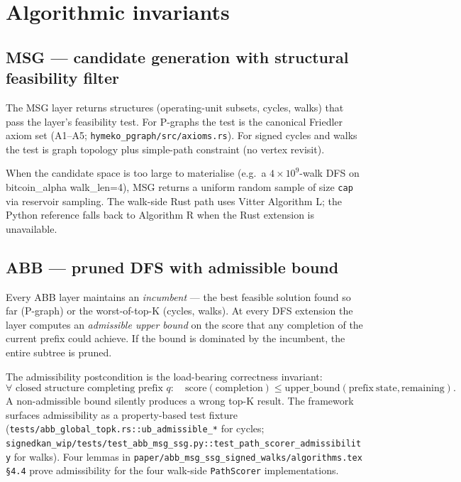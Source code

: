 \documentclass[11pt]{article}
\begin{document}
\section{Algorithmic invariants}

\subsection{MSG --- candidate generation with structural feasibility filter}

The MSG layer returns structures (operating-unit subsets, cycles,
walks) that pass the layer's feasibility test. For P-graphs the test
is the canonical Friedler axiom set (A1--A5;
\texttt{hymeko\_pgraph/src/axioms.rs}). For signed cycles and walks
the test is graph topology plus simple-path constraint (no vertex
revisit).

When the candidate space is too large to materialise (e.g.\ a
$4 \times 10^9$-walk DFS on bitcoin\_alpha walk\_len=4), MSG returns
a uniform random sample of size \texttt{cap} via reservoir sampling.
The walk-side Rust path uses Vitter Algorithm L; the Python
reference falls back to Algorithm R when the Rust extension is
unavailable.

\subsection{ABB --- pruned DFS with admissible bound}

Every ABB layer maintains an \emph{incumbent} --- the best feasible
solution found so far (P-graph) or the worst-of-top-K (cycles,
walks). At every DFS extension the layer computes an
\emph{admissible upper bound} on the score that any completion of
the current prefix could achieve. If the bound is dominated by the
incumbent, the entire subtree is pruned.

The admissibility postcondition is the load-bearing correctness
invariant:
\begin{equation}
  \forall \text{ closed structure completing prefix } q:\quad
  \mathrm{score}(\mathrm{completion}) \le
  \mathrm{upper\_bound}(\mathrm{prefix\ state}, \mathrm{remaining}).
\end{equation}
A non-admissible bound silently produces a wrong top-K result. The
framework surfaces admissibility as a property-based test fixture
(\texttt{tests/abb\_global\_topk.rs::ub\_admissible\_*} for cycles;
\texttt{signedkan\_wip/tests/test\_abb\_msg\_ssg.py::test\_path\_scorer\_admissibility}
for walks). Four lemmas in
\texttt{paper/abb\_msg\_ssg\_signed\_walks/algorithms.tex \S4.4}
prove admissibility for the four walk-side
\texttt{PathScorer} implementations.
\end{document}
